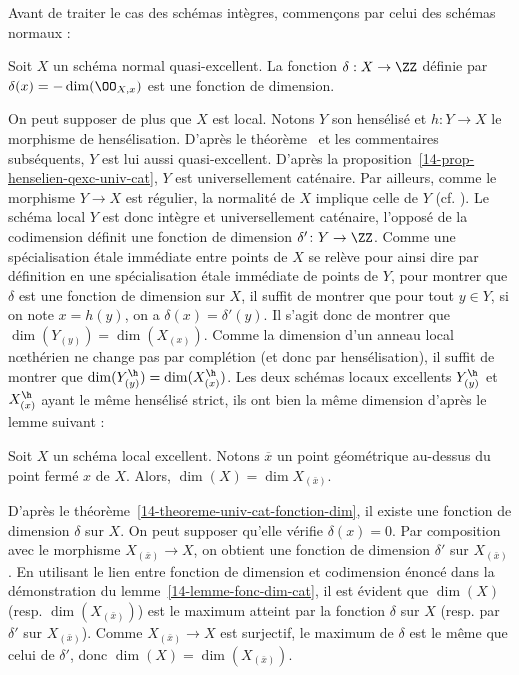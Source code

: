 \documentclass[10pt]{../fichiers-configuration-latex/smfart}
\begin{document}
Avant de traiter le cas des schémas intègres, commençons par celui des schémas normaux :


\begin{proposition2}\label{14-proposition-codim-fonction-de-dimension-sur-normal-quasi-excellent}
Soit $X$ un schéma normal quasi-excellent. La fonction $\delta : X \rightarrow \ZZ$ définie par
$\delta(x) = -\dim(\OO_{X,x})$ est une fonction de dimension.  \end{proposition2}


\begin{démo} On peut supposer de plus que $X$ est local. Notons $Y$ son hensélisé et $h\colon Y\to
X$ le morphisme de hensélisation.  D'après le théorème~ et les commentaires
subséquents, $Y$ est lui aussi quasi-excellent. D'après la
proposition~\ref{14-prop-henselien-qexc-univ-cat}, $Y$ est universellement caténaire. Par ailleurs,
comme le morphisme $Y\to X$ est régulier, la normalité de $X$ implique celle de $Y$ (cf.
). Le schéma local $Y$ est donc intègre et universellement caténaire, l'opposé
de la codimension définit une fonction de dimension $\delta'\colon Y\rightarrow \ZZ$. Comme une
spécialisation étale immédiate entre points de $X$ se relève pour ainsi dire par définition en une
spécialisation étale immédiate de points de $Y$, pour montrer que $\delta$ est une fonction de
dimension sur $X$, il suffit de montrer que pour tout $y\in Y$, si on note $x=h(y)$, on a
$\delta(x)=\delta'(y)$. Il s'agit donc de montrer que $\dim(Y_{(y)})=\dim(X_{(x)})$. Comme la
dimension d'un anneau local nœthérien ne change pas par complétion (et donc par hensélisation), il
suffit de montrer que $\dim(Y^\h_{(y)})=\dim(X^\h_{(x)})$. Les deux schémas locaux excellents
$Y^\h_{(y)}$ et $X^\h_{(x)}$ ayant le même hensélisé strict, ils ont bien la même dimension d'après
le lemme suivant : \end{démo}

\begin{lemme2} Soit $X$ un schéma local excellent. Notons $\overline x$ un point géométrique
au-dessus du point fermé $x$ de $X$. Alors, $\dim(X)=\dim X_{(\bar x)}$.  \end{lemme2}

\begin{démo} D'après le théorème~\ref{14-theoreme-univ-cat-fonction-dim}, il existe une fonction de
dimension $\delta$ sur $X$. On peut supposer qu'elle vérifie $\delta(x)=0$. Par composition avec le
morphisme $X_{(\bar x)}\to X$, on obtient une fonction de dimension $\delta'$ sur $X_{(\bar x)}$. En
utilisant le lien entre fonction de dimension et codimension énoncé dans la démonstration du
lemme~\ref{14-lemme-fonc-dim-cat}, il est évident que $\dim(X)$ (resp. $\dim(X_{(\bar x)})$) est le
maximum atteint par la fonction $\delta$ sur $X$ (resp. par $\delta'$ sur $X_{(\bar x)}$). Comme
$X_{(\bar x)}\to X$ est surjectif, le maximum de $\delta$ est le même que celui de $\delta'$, donc
$\dim(X)=\dim(X_{(\bar x)})$.  \end{démo}
\end{document}
